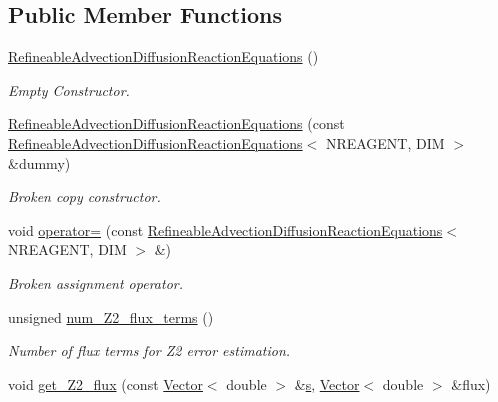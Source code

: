 \subsection*{Public Member Functions}
\begin{DoxyCompactItemize}
\item 
\hyperlink{classoomph_1_1RefineableAdvectionDiffusionReactionEquations_a7db3e6d43b4c5f5c4fa70471b9a13363}{Refineable\+Advection\+Diffusion\+Reaction\+Equations} ()
\begin{DoxyCompactList}\small\item\em Empty Constructor. \end{DoxyCompactList}\item 
\hyperlink{classoomph_1_1RefineableAdvectionDiffusionReactionEquations_ae284d628aa8678d5c74af6132442a8f6}{Refineable\+Advection\+Diffusion\+Reaction\+Equations} (const \hyperlink{classoomph_1_1RefineableAdvectionDiffusionReactionEquations}{Refineable\+Advection\+Diffusion\+Reaction\+Equations}$<$ N\+R\+E\+A\+G\+E\+NT, D\+IM $>$ \&dummy)
\begin{DoxyCompactList}\small\item\em Broken copy constructor. \end{DoxyCompactList}\item 
void \hyperlink{classoomph_1_1RefineableAdvectionDiffusionReactionEquations_a437e94eef9468acb33991bcb545ac175}{operator=} (const \hyperlink{classoomph_1_1RefineableAdvectionDiffusionReactionEquations}{Refineable\+Advection\+Diffusion\+Reaction\+Equations}$<$ N\+R\+E\+A\+G\+E\+NT, D\+IM $>$ \&)
\begin{DoxyCompactList}\small\item\em Broken assignment operator. \end{DoxyCompactList}\item 
unsigned \hyperlink{classoomph_1_1RefineableAdvectionDiffusionReactionEquations_a3d19d1247a3ba838a67263b75d6341a0}{num\+\_\+\+Z2\+\_\+flux\+\_\+terms} ()
\begin{DoxyCompactList}\small\item\em Number of \textquotesingle{}flux\textquotesingle{} terms for Z2 error estimation. \end{DoxyCompactList}\item 
void \hyperlink{classoomph_1_1RefineableAdvectionDiffusionReactionEquations_aaebce9418da050917be3deb004adf7c7}{get\+\_\+\+Z2\+\_\+flux} (const \hyperlink{classoomph_1_1Vector}{Vector}$<$ double $>$ \&\hyperlink{cfortran_8h_ab7123126e4885ef647dd9c6e3807a21c}{s}, \hyperlink{classoomph_1_1Vector}{Vector}$<$ double $>$ \&flux)

\end{DoxyCompactItemize}
